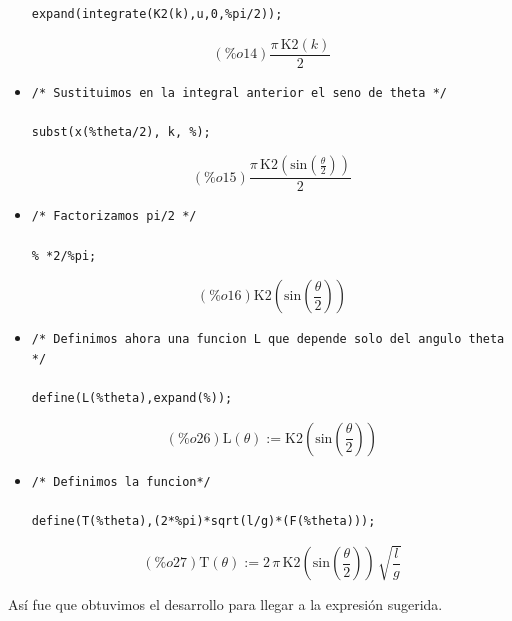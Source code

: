 \documentclass[12 pt]{article}
\begin{document}
\begin{itemize}
\begin{verbatim}
expand(integrate(K2(k),u,0,%pi/2));
\end{verbatim}
\[(\%o14) \frac{\pi \,\mathrm{K2}\left( k\right) }{2}\]
\item \begin{verbatim}/* Sustituimos en la integral anterior el seno de theta */

subst(x(%theta/2), k, %);
\end{verbatim}
\[(\%o15) \frac{\pi \,\mathrm{K2}\left( \mathrm{sin}\left( \frac{\theta}{2}\right) \right) }{2}\]
\item \begin{verbatim}
/* Factorizamos pi/2 */

% *2/%pi;
\end{verbatim}
\[(\%o16) \mathrm{K2}\left( \mathrm{sin}\left( \frac{\theta}{2}\right) \right) \]
\item \begin{verbatim}
/* Definimos ahora una funcion L que depende solo del angulo theta */

define(L(%theta),expand(%));
\end{verbatim}
\[(\%o26) \mathrm{L}\left( \theta\right) :=\mathrm{K2}\left( \mathrm{sin}\left( \frac{\theta}{2}\right) \right) \]

\item \begin{verbatim}
/* Definimos la funcion*/

define(T(%theta),(2*%pi)*sqrt(l/g)*(F(%theta)));
\end{verbatim}
\[(\%o27) \mathrm{T}\left( \theta\right) :=2\,\pi \,\mathrm{K2}\left( \mathrm{sin}\left( \frac{\theta}{2}\right) \right) \,\sqrt{\frac{l}{g}}\]
	\end{itemize}
	Así fue que obtuvimos el desarrollo para llegar a la expresión sugerida.
	
\end{document}

